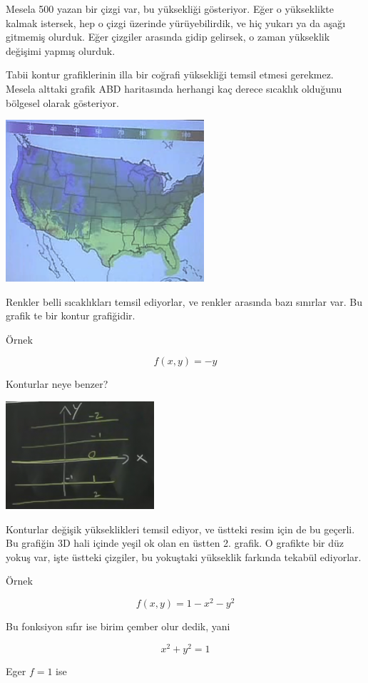 \documentclass[12pt,fleqn]{article}\usepackage{../../common}
\begin{document}
Mesela 500 yazan bir çizgi var, bu yüksekliği gösteriyor. Eğer o yükseklikte
kalmak istersek, hep o çizgi üzerinde yürüyebilirdik, ve hiç yukarı ya da aşağı
gitmemiş olurduk. Eğer çizgiler arasında gidip gelirsek, o zaman yükseklik
değişimi yapmış olurduk.

Tabii kontur grafiklerinin illa bir coğrafi yüksekliği temsil etmesi
gerekmez. Mesela alttaki grafik ABD haritasında herhangi kaç derece sıcaklık
olduğunu bölgesel olarak gösteriyor.

\includegraphics[height=6cm]{8_10.png}

Renkler belli sıcaklıkları temsil ediyorlar, ve renkler arasında bazı sınırlar
var. Bu grafik te bir kontur grafiğidir.

Örnek

$$ f(x,y) = -y $$

Konturlar neye benzer? 

\includegraphics[height=4cm]{8_11.png}

Konturlar değişik yükseklikleri temsil ediyor, ve üstteki resim için de bu
geçerli. Bu grafiğin 3D hali içinde yeşil ok olan en üstten 2. grafik. O
grafikte bir düz yokuş var, işte üstteki çizgiler, bu yokuştaki yükseklik
farkında tekabül ediyorlar.

Örnek

$$ f(x,y) = 1-x^2-y^2 $$

Bu fonksiyon sıfır ise birim çember olur dedik, yani

$$ x^2+y^2=1 $$

Eger $f=1$ ise
\end{document}
